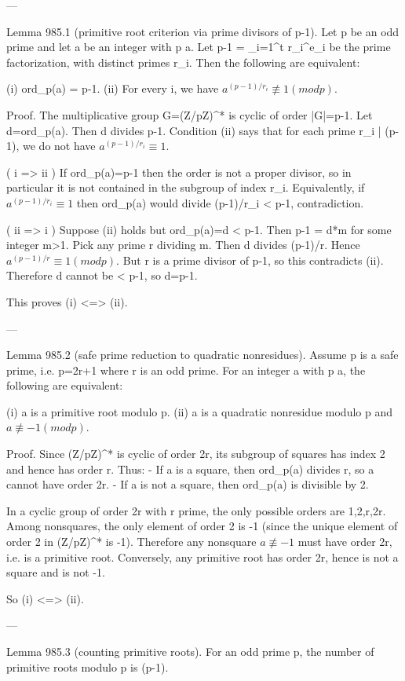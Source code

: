 ---

Lemma 985.1 (primitive root criterion via prime divisors of p-1).
Let p be an odd prime and let a be an integer with p \nmid a. Let p-1 = \prod_{i=1}^t r_i^{e_i}
be the prime factorization, with distinct primes r_i. Then the following are equivalent:

  (i) ord_p(a) = p-1.
  (ii) For every i, we have \(a^{(p-1)/r_i} \not\equiv 1 (mod p)\).

Proof.
The multiplicative group G=(Z/pZ)^* is cyclic of order |G|=p-1.
Let d=ord_p(a). Then d divides p-1. Condition (ii) says that for each prime r_i | (p-1),
we do not have \(a^{(p-1)/r_i} \equiv 1\).

( i => ii ) If ord_p(a)=p-1 then the order is not a proper divisor, so in particular it is not
contained in the subgroup of index r_i. Equivalently, if \(a^{(p-1)/r_i}\equiv 1\) then ord_p(a)
would divide (p-1)/r_i < p-1, contradiction.

( ii => i ) Suppose (ii) holds but ord_p(a)=d < p-1. Then p-1 = d*m for some integer m>1.
Pick any prime r dividing m. Then d divides (p-1)/r. Hence \(a^{(p-1)/r} \equiv 1 (mod p)\).
But r is a prime divisor of p-1, so this contradicts (ii).
Therefore d cannot be < p-1, so d=p-1.

This proves (i) <=> (ii).

---

Lemma 985.2 (safe prime reduction to quadratic nonresidues).
Assume p is a safe prime, i.e. p=2r+1 where r is an odd prime.
For an integer a with p \nmid a, the following are equivalent:

  (i) a is a primitive root modulo p.
  (ii) a is a quadratic nonresidue modulo p and \(a \not\equiv -1 (mod p)\).

Proof.
Since (Z/pZ)^* is cyclic of order 2r, its subgroup of squares has index 2 and hence has
order r. Thus:
- If a is a square, then ord_p(a) divides r, so a cannot have order 2r.
- If a is not a square, then ord_p(a) is divisible by 2.

In a cyclic group of order 2r with r prime, the only possible orders are 1,2,r,2r.
Among nonsquares, the only element of order 2 is -1 (since the unique element of order 2
in (Z/pZ)^* is -1). Therefore any nonsquare \(a \not\equiv -1\) must have order 2r, i.e. is a
primitive root.
Conversely, any primitive root has order 2r, hence is not a square and is not -1.

So (i) <=> (ii).

---

Lemma 985.3 (counting primitive roots).
For an odd prime p, the number of primitive roots modulo p is \varphi(p-1).

